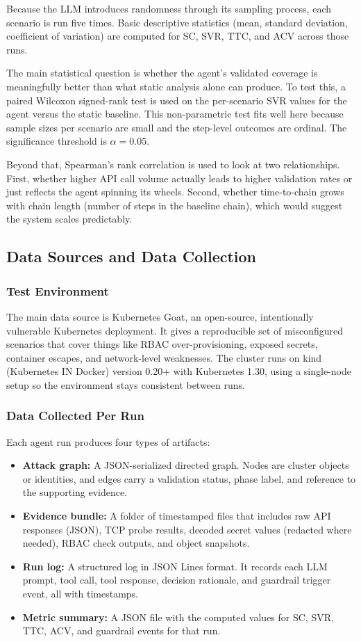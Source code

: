 \documentclass[conference]{IEEEtran}
\begin{document}
Because the LLM introduces randomness through its sampling process, each scenario is run five times. Basic descriptive statistics (mean, standard deviation, coefficient of variation) are computed for SC, SVR, TTC, and ACV across those runs.

The main statistical question is whether the agent's validated coverage is meaningfully better than what static analysis alone can produce. To test this, a paired Wilcoxon signed-rank test is used on the per-scenario SVR values for the agent versus the static baseline. This non-parametric test fits well here because sample sizes per scenario are small and the step-level outcomes are ordinal. The significance threshold is $\alpha = 0.05$.

Beyond that, Spearman's rank correlation is used to look at two relationships. First, whether higher API call volume actually leads to higher validation rates or just reflects the agent spinning its wheels. Second, whether time-to-chain grows with chain length (number of steps in the baseline chain), which would suggest the system scales predictably.

\subsection{Data Sources and Data Collection}

\subsubsection{Test Environment}
The main data source is Kubernetes Goat, an open-source, intentionally vulnerable Kubernetes deployment. It gives a reproducible set of misconfigured scenarios that cover things like RBAC over-provisioning, exposed secrets, container escapes, and network-level weaknesses. The cluster runs on kind (Kubernetes IN Docker) version 0.20+ with Kubernetes 1.30, using a single-node setup so the environment stays consistent between runs.

\subsubsection{Data Collected Per Run}
Each agent run produces four types of artifacts:
\begin{itemize}
    \item \textbf{Attack graph:} A JSON-serialized directed graph. Nodes are cluster objects or identities, and edges carry a validation status, phase label, and reference to the supporting evidence.
    \item \textbf{Evidence bundle:} A folder of timestamped files that includes raw API responses (JSON), TCP probe results, decoded secret values (redacted where needed), RBAC check outputs, and object snapshots.
    \item \textbf{Run log:} A structured log in JSON Lines format. It records each LLM prompt, tool call, tool response, decision rationale, and guardrail trigger event, all with timestamps.
    \item \textbf{Metric summary:} A JSON file with the computed values for SC, SVR, TTC, ACV, and guardrail events for that run.
\end{itemize}
\end{document}
